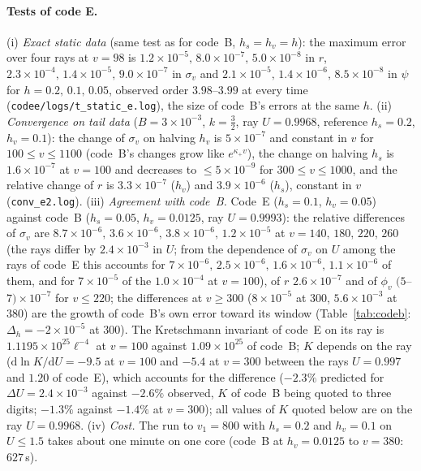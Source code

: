 \documentclass[11pt]{article}
\begin{document}
\paragraph{Tests of code E.} (i) \emph{Exact static data} (same test as for code~B, $h_s=h_v=h$): the maximum error over four rays at $v=98$ is $1.2\times10^{-5},\,8.0\times10^{-7},\,5.0\times10^{-8}$ in $r$, $2.3\times10^{-4},\,1.4\times10^{-5},\,9.0\times10^{-7}$ in $\sigma_v$ and $2.1\times10^{-5},\,1.4\times10^{-6},\,8.5\times10^{-8}$ in $\psi$ for $h=0.2,\,0.1,\,0.05$, observed order $3.98$--$3.99$ at every time (\texttt{codee/logs/t\_static\_e.log}), the size of code~B's errors at the same $h$. (ii) \emph{Convergence on tail data} ($B=3\times10^{-3}$, $k=\tfrac32$, ray $U=0.9968$, reference $h_s=0.2$, $h_v=0.1$): the change of $\sigma_v$ on halving $h_v$ is $5\times10^{-7}$ and constant in $v$ for $100\le v\le1100$ (code~B's changes grow like $e^{\kappa_+v}$), the change on halving $h_s$ is $1.6\times10^{-7}$ at $v=100$ and decreases to $\le5\times10^{-9}$ for $300\le v\le1000$, and the relative change of $r$ is $3.3\times10^{-7}$ ($h_v$) and $3.9\times10^{-6}$ ($h_s$), constant in $v$ (\texttt{conv\_e2.log}). (iii) \emph{Agreement with code~B.} Code~E ($h_s=0.1$, $h_v=0.05$) against code~B ($h_s=0.05$, $h_v=0.0125$, ray $U=0.9993$): the relative differences of $\sigma_v$ are $8.7\times10^{-6},\,3.6\times10^{-6},\,3.8\times10^{-6},\,1.2\times10^{-5}$ at $v=140,\,180,\,220,\,260$ (the rays differ by $2.4\times10^{-3}$ in $U$; from the dependence of $\sigma_v$ on $U$ among the rays of code~E this accounts for $7\times10^{-6},\,2.5\times10^{-6},\,1.6\times10^{-6},\,1.1\times10^{-6}$ of them, and for $7\times10^{-5}$ of the $1.0\times10^{-4}$ at $v=100$), of $r$ $2.6\times10^{-7}$ and of $\phi_v$ $(5$--$7)\times10^{-7}$ for $v\le220$; the differences at $v\ge300$ ($8\times10^{-5}$ at $300$, $5.6\times10^{-3}$ at $380$) are the growth of code~B's own error toward its window (Table~\ref{tab:codeb}: $\Delta_h=-2\times10^{-5}$ at $300$). The Kretschmann invariant of code~E on its ray is $1.1195\times10^{25}\ell^{-4}$ at $v=100$ against $1.09\times10^{25}$ of code~B; $K$ depends on the ray ($\mathrm{d}\ln K/\mathrm{d}U=-9.5$ at $v=100$ and $-5.4$ at $v=300$ between the rays $U=0.997$ and $1.20$ of code~E), which accounts for the difference ($-2.3\%$ predicted for $\Delta U=2.4\times10^{-3}$ against $-2.6\%$ observed, $K$ of code~B being quoted to three digits; $-1.3\%$ against $-1.4\%$ at $v=300$); all values of $K$ quoted below are on the ray $U=0.9968$. (iv) \emph{Cost.} The run to $v_1=800$ with $h_s=0.2$ and $h_v=0.1$ on $U\le1.5$ takes about one minute on one core (code~B at $h_v=0.0125$ to $v=380$: $627\,$s).
\end{document}
